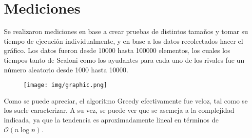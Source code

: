 \section{Mediciones}

Se realizaron mediciones en base a crear pruebas de distintos tamaños y tomar su tiempo de ejecución individualmente, y en base a los datos recolectados hacer el gráfico. Los datos fueron desde 10000 hasta 100000 elementos, los cuales los tiempos tanto de Scaloni como los ayudantes para cada uno de los rivales fue un número aleatorio desde 1000 hasta 10000.

\begin{figure}[H]
	\centering
	\texttt{[image: img/graphic.png]}
\end{figure}

Como se puede apreciar, el algoritmo Greedy efectivamente fue veloz, tal como se los suele caracterizar. A su vez, se puede ver que se asemeja a la complejidad indicada, ya que la tendencia es aproximadamente lineal en términos de $\mathcal{O}\left(n \log n\right)$.
